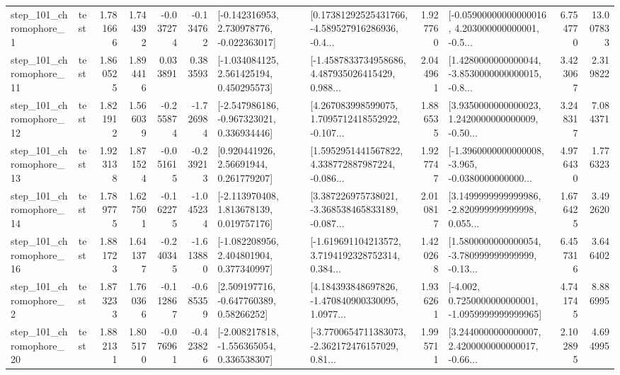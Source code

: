 \begin{tabular}{llrrrrllrlrr}
   step\_101\_chromophore\_1 &      test &      1.781666 &    1.744392 &     -0.037274 & -0.134762 &   [-0.142316953, 2.730978776, -0.022363017] &  [0.17381292525431766, -4.589527916286936, -0.4... &       1.927760 &  [-0.05900000000000016, 4.203000000000001, -0.5... &            6.754770 &         13.007833 \\
  step\_101\_chromophore\_11 &      test &      1.860525 &    1.894416 &      0.033891 &  0.383593 &    [-1.034084125, 2.561425194, 0.450295573] &  [-1.4587833734958686, 4.487935026415429, 0.988... &       2.044961 &  [1.4280000000000044, -3.8530000000000015, -0.8... &            3.423067 &          2.319822 \\
  step\_101\_chromophore\_12 &      test &      1.821912 &    1.566039 &     -0.255874 & -1.726984 &   [-2.547986186, -0.967323021, 0.336934446] &  [4.267083998599075, 1.7095712418552922, -0.107... &       1.886535 &  [3.9350000000000023, 1.2420000000000009, -0.50... &            3.248317 &          7.084371 \\
  step\_101\_chromophore\_13 &      test &      1.923138 &    1.871524 &     -0.051615 & -0.239213 &      [0.920441926, 2.56691944, 0.261779207] &  [1.5952951441567822, 4.338772887987224, -0.086... &       1.927747 &  [-1.3960000000000008, -3.965, -0.0380000000000... &            4.976430 &          1.776323 \\
  step\_101\_chromophore\_14 &      test &      1.789775 &    1.627501 &     -0.162275 & -1.045234 &    [-2.113970408, 1.813678139, 0.019757176] &  [3.387226975738021, -3.368538465833189, -0.087... &       2.010817 &  [3.1499999999999986, -2.820999999999998, 0.055... &            1.676425 &          3.492620 \\
  step\_101\_chromophore\_16 &      test &      1.881723 &    1.641377 &     -0.240345 & -1.613880 &    [-1.082208956, 2.404801904, 0.377340997] &  [-1.619691104213572, 3.7194192328752314, 0.384... &       1.420268 &  [1.5800000000000054, -3.780999999999999, -0.13... &            6.457316 &          3.646402 \\
   step\_101\_chromophore\_2 &      test &      1.873233 &    1.760366 &     -0.112867 & -0.685359 &     [2.509197716, -0.647760389, 0.58266252] &  [4.184393848697826, -1.470840900330095, 1.0977... &       1.936261 &  [-4.002, 0.7250000000000001, -1.0959999999999965] &            4.741745 &          8.886995 \\
  step\_101\_chromophore\_20 &      test &      1.882131 &    1.805170 &     -0.076961 & -0.423826 &   [-2.008217818, -1.556365054, 0.336538307] &  [-3.7700654711383073, -2.362172476157029, 0.81... &       1.995711 &  [3.2440000000000007, 2.4200000000000017, -0.66... &            2.102895 &          4.694995 \\

\end{tabular}
